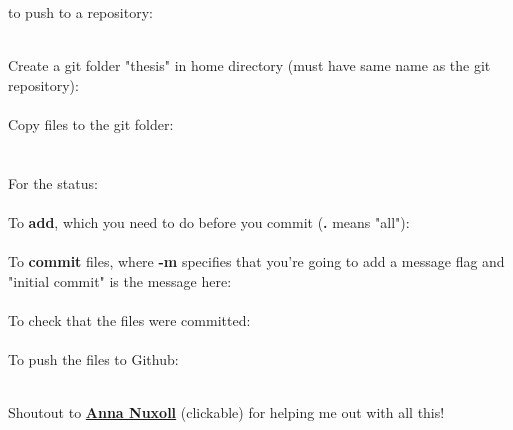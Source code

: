 \documentclass[11pt,obeyspaces]{article}
\begin{document}
\centerline{\sc to push to a repository:}
\\
Create a git folder "thesis" in home directory (must have same name as the git repository):\\
 \textcolor{blue}{} \\
Copy files to the git folder: \\
 \textcolor{blue}{} \\
 \textcolor{blue}{} \\
For the status: \\
 \\
To {\bf add}, which you need to do before you commit ({\bf .} means "all"): \\
 \\ 
To {\bf commit} files, where {\bf -m} specifies that you're going to add a message flag and "initial commit" is the message here: \\
 \\
To check that the files were committed:\\
\\
To push the files to Github:\\
\\

\bigskip

\centerline{Shoutout to \href{https://github.com/annanuxoll}{\bf Anna Nuxoll} (clickable) for helping me out with all this!}
\end{document}
